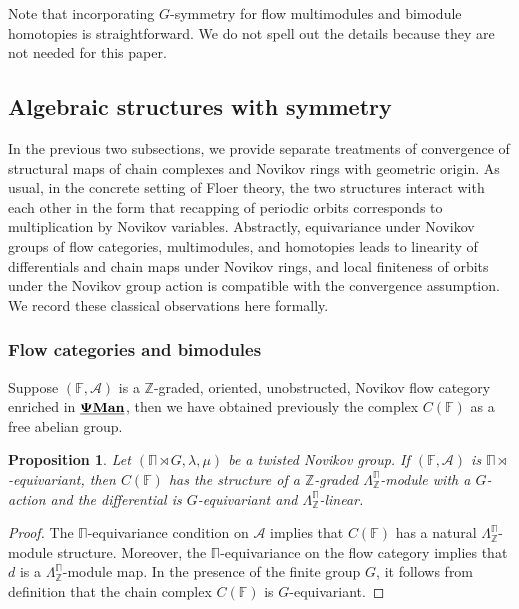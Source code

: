 \documentclass[reqno, 10pt]{amsart}
\numberwithin{equation}{section}
\numberwithin{equation}{section}
\newtheorem{prop}[thm]{Proposition}
\theoremstyle{definition}
\theoremstyle{remark}
\newcommand{\mb}{\mathbb}
\newcommand{\mc}{\mathcal}
\newcommand{\pman}{\uds{{\bf \Psi}{\bf Man}}}
\newcommand{\uds}[1]{\underline{\smash{#1}}}
\begin{document}
Note that incorporating $G$-symmetry for flow multimodules and bimodule homotopies is straightforward. We do not spell out the details because they are not needed for this paper.



\subsection{Algebraic structures with symmetry}\label{subsection64}
In the previous two subsections, we provide separate treatments of convergence of structural maps of chain complexes and Novikov rings with geometric origin. As usual, in the concrete setting of Floer theory, the two structures interact with each other in the form that recapping of periodic orbits corresponds to multiplication by Novikov variables. Abstractly, equivariance under Novikov groups of flow categories, multimodules, and homotopies leads to linearity of differentials and chain maps under Novikov rings, and local finiteness of orbits under the Novikov group action is compatible with the convergence assumption. We record these classical observations here formally.

\subsubsection{Flow categories and bimodules}

Suppose $({\mb F}, {\mc A})$ is a ${\mb Z}$-graded, oriented, unobstructed, Novikov flow category enriched in $\pman$, then we have obtained previously the complex $C ({\mb F})$ as a free abelian group. 

\begin{prop}\label{prop_equivariant_differential}
Let $(\mb\Pi \rtimes G, \lambda, \mu)$ be a twisted Novikov group. If $({\mb F}, {\mc A})$ is $\mb\Pi \rtimes$-equivariant, then $C ({\mb F})$ has the structure of a ${\mb Z}$-graded $\Lambda_{\mb Z}^{\mb\Pi}$-module with a $G$-action and the differential is $G$-equivariant and $\Lambda_{\mb Z}^{\mb\Pi}$-linear.
\end{prop}

\begin{proof}
The $\mb\Pi$-equivariance condition on ${\mc A}$  implies that $C ({\mb F})$ has a natural $\Lambda_{\mb Z}^{\mb\Pi}$-module structure.  Moreover, the $\mb\Pi$-equivariance on the flow category implies that $d$ is a $\Lambda_{\mb Z}^{\mb\Pi}$-module map. In the presence of the finite group $G$, it follows from definition that the chain complex $C ({\mb F})$ is $G$-equivariant.
\end{proof}
\end{document}
